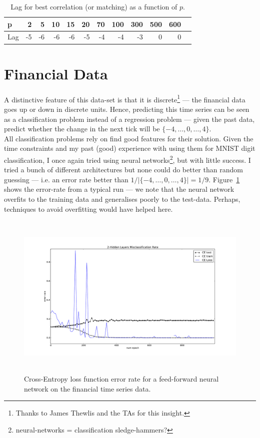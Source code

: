 \documentclass[11pt]{report}
\begin{document}
\begin{table}[htp]
\begin{center}
\begin{tabular}{|l||r|r|r|r|r|r|r|r|r|r|r|}
\hline
p      & 2 & 5 & 10 & 15 & 20 & 70 & 100 & 300 & 500 & 600\\\hline
Lag  & -5 &  -6 & -6 & -6 & -5 & -4 & -4 & -3 & 0 & 0 \\\hline
\end{tabular}
\caption{Lag for best correlation (or matching) as a function of $p$.}
\label{tab1}
\end{center}
\end{table}

\section*{Financial Data}
A distinctive feature of this data-set is that it is discrete\footnote{Thanks to James Thewlis and the TAs for this insight.} --- the financial data goes up or down in discrete units. Hence, predicting this time series can be seen as a classification problem instead of a regression problem --- given the past data, predict whether the change in the next tick will be $\{-4,\hdots,0,\hdots,4\}$.\\

All classification problems rely on find good features for their solution. Given the time constraints and my past (good) experience with using them for MNIST digit classification, I once again tried using neural networks\footnote{neural-networks = classification sledge-hammers?}, but with little success. I tried a bunch of different architectures but none could do better than random guessing --- i.e. an error rate better than $1/|\{-4,\hdots,0,\hdots,4\}| = 1/9$. Figure~\ref{fig:nn} shows the error-rate from a typical run --- we note that the neural network overfits to the training data and generalises poorly to the test-data. Perhaps, techniques to avoid overfitting would have helped here.

\begin{figure}[hbp]
\begin{center}
\includegraphics[width=18cm,height=8cm]{figs/two_layer_finance.pdf}
\end{center}
\caption[]{Cross-Entropy loss function error rate for a feed-forward neural network on the financial time series data.}
\label{fig:nn}
\end{figure}
\clearpage
\end{document}
